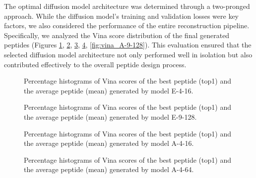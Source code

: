 The optimal diffusion model architecture was determined through a two-pronged approach. While the diffusion model's training and validation losses were key factors, we also considered the performance of the entire reconstruction pipeline. Specifically, we analyzed the Vina score distribution of the final generated peptides (Figures \ref{fig:vina_E-4-16}, \ref{fig:vina_E-9-128}, \ref{fig:vina_A-4-16}, \ref{fig:vina_A-4-64}, \ref{fig:vina_A-9-128}). This evaluation ensured that the selected diffusion model architecture not only performed well in isolation but also contributed effectively to the overall peptide design process. \\

\begin{figure}
  \center


  \caption{Percentage histograms of Vina scores of the best peptide (top1) and the average peptide (mean) generated by model E-4-16.}

  \label{fig:vina_E-4-16}
\end{figure}

\begin{figure}
  \center


  \caption{Percentage histograms of Vina scores of the best peptide (top1) and the average peptide (mean) generated by model E-9-128.}

  \label{fig:vina_E-9-128}
\end{figure}

\begin{figure}
  \center


  \caption{Percentage histograms of Vina scores of the best peptide (top1) and the average peptide (mean) generated by model A-4-16.}

  \label{fig:vina_A-4-16}
\end{figure}

\begin{figure}
  \center


  \caption{Percentage histograms of Vina scores of the best peptide (top1) and the average peptide (mean) generated by model A-4-64.}

  \label{fig:vina_A-4-64}
\end{figure}

